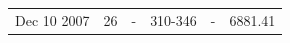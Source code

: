 \documentclass[a4paper,12pt]{article}
\begin{document}
\begin{table}
\begin{tabular}{rrrrrr}
                                                                                                                                                                                                                                                                                                                                                                                                                                                                                                                                                                                                                                                                                                                                                                                                                                                                                                                                                                                                                                                                                        Dec 10 2007 & 26    & -     & 310-346 & -     & 6881.41 \\

\end{tabular}
\end{table}
\end{document}
